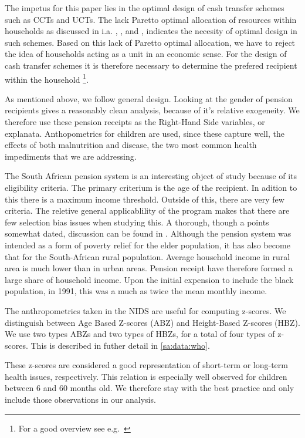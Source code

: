 \begin{refsection}
The impetus for this paper lies in the optimal design of cash transfer schemes such as CCTs and UCTs.
The lack Paretto optimal allocation of resources within households as discussed in i.a.
\textcite{udry1995gender}, \textcite{udry1996gender}, and \textcite{duflo2004intrahousehold},
indicates the necesity of optimal design in such schemes.
Based on this lack of Paretto optimal allocation,
we have to reject the idea of households acting as a unit in an economic sense.
For the design of cash transfer schemes it is therefore necessary to determine the prefered recipient within the household
\footnote{For a good overview see e.g.~\textcite{haddad1997intrahousehold}}.

As mentioned above, we follow \textcite{duflo2000child,duflo2003grandmothers} general design.
Looking at the gender of pension recipients gives a reasonably clean analysis,
because of it's relative exogeneity.
We therefore use these pension receipts as the Right-Hand Side variables, or explanata.
Anthopometrics for children are used, since these capture well, the effects of both malnutrition and disease,
the two most common health impediments that we are addressing.

The South African pension system is an interesting object of study because of its eligibility criteria.
The primary criterium is the age of the recipient.
In adition to this there is a maximum income threshold.
Outside of this, there are very few criteria.
The reletive general applicablility of the program makes that there are few selection bias issues when studying this.
A thorough, though a points somewhat dated, discussion can be found in \textcite{case1998large}.
Although the pension system was intended as a form of poverty relief for the elder population,
it has also become that for the South-African rural population\parencite{tangwe2013impact}.
Average household income in rural area is much lower than in urban areas.
Pension receipt have therefore formed a large share of household income.
Upon the initial expension to include the black population, in 1991,
this was a much as twice the mean monthly income.

The anthropometrics taken in the NIDS are useful for computing z-scores.
We distinguish between Age Based Z-scores (ABZ) and Height-Based Z-scores (HBZ).
We use two types ABZs and two types of HBZs, for a total of four types of z-scores.
This is described in futher detail in \autoref{sa:data:who}.

These z-scores are considered a good representation of short-term or long-term health issues, respectively.
This relation is especially well observed for children between 6 and 60 months old.
We therefore stay with the best practice and only include those observations in our analysis.


\end{refsection}

